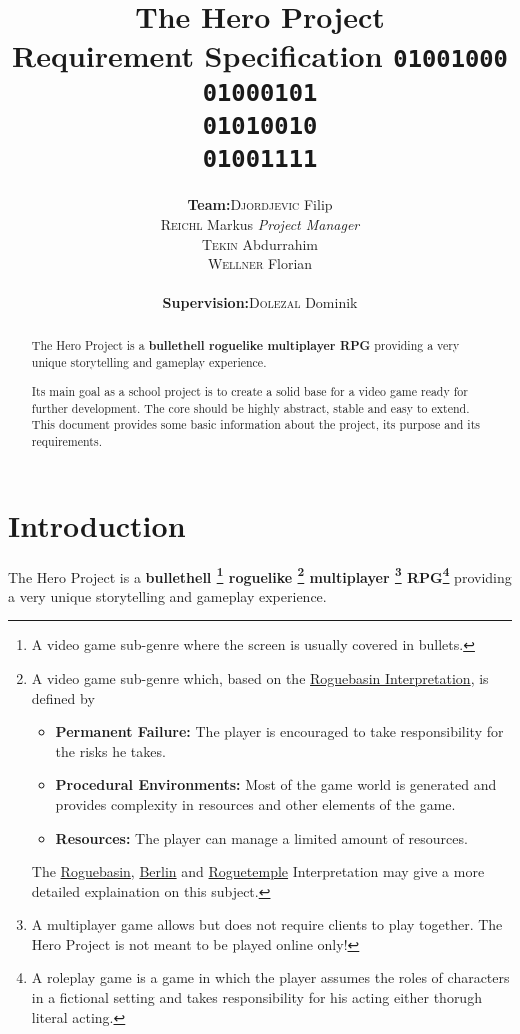 \documentclass[11pt]{article}
\title{
  \textbf{The Hero Project}\\
  \large{Requirement Specification}
  \linebreak
  \linebreak
  \small{\texttt{01001000\\01000101\\01010010\\01001111}}
}
\author{
  \begin{tabular}{rl}
    \textbf{Team:}
    & \textsc{Djordjevic} Filip\\
    & \textsc{Reichl} Markus \small{\textit{Project Manager}}\\
    & \textsc{Tekin} Abdurrahim\\
    & \textsc{Wellner} Florian\\
    \\
    \textbf{Supervision:}
    & \textsc{Dolezal} Dominik
  \end{tabular}
}
\begin{document}
\begin{titlepage}
  \clearpage
  \maketitle
  \thispagestyle{empty}
  
  \begin{abstract}
    \begin{flushleft}
      The Hero Project is a \textbf{bullethell roguelike multiplayer RPG} providing a very unique storytelling and gameplay experience.
      
      Its main goal as a school project is to create a solid base for a video game ready for further development. The core should be highly abstract, stable and easy to extend.
      \linebreak
      \linebreak
      This document provides some basic information about the project, its purpose and its requirements.
     \end{flushleft}
  \end{abstract}
\end{titlepage}

\tableofcontents
\newpage

\section{Introduction}
The Hero Project is a \textbf{
  bullethell
  \footnote{A video game sub-genre where the screen is usually covered in bullets.}
  roguelike
  \footnote{A video game sub-genre which, based on the \href{http://roguebasin.com/roguelike-definition}{Roguebasin Interpretation}, is defined by 
    \begin{itemize}
      \item \textbf{Permanent Failure:} The player is encouraged to take responsibility for the risks he takes.
      \item \textbf{Procedural Environments:} Most of the game world is generated and provides complexity in resources and other elements of the game.
      \item \textbf{Resources:} The player can manage a limited amount of resources.
    \end{itemize}
    The \href{http://roguebasin.com/roguelike-definition}{Roguebasin}, \href{http://roguebasin.com/index.php?title=Berlin_Interpretation}{Berlin} and \href{http://roguetemple.com/roguelike-definition}{Roguetemple} Interpretation may give a more detailed explaination on this subject.
  }
  multiplayer
  \footnote{A multiplayer game allows but does not require clients to play together. The Hero Project is not meant to be played online only!}
  RPG\footnote{A roleplay game is a game in which the player assumes the roles of characters in a fictional setting and takes responsibility for his acting either thorugh literal acting.}
} providing a very unique storytelling and gameplay experience.
\end{document}

